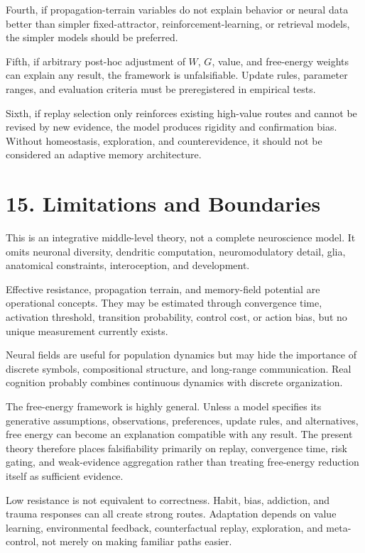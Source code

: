 \documentclass[11pt, a4paper]{article}
\begin{document}
Fourth, if propagation-terrain variables do not explain behavior or neural data better than simpler fixed-attractor, reinforcement-learning, or retrieval models, the simpler models should be preferred.

Fifth, if arbitrary post-hoc adjustment of $W$, $G$, value, and free-energy weights can explain any result, the framework is unfalsifiable. Update rules, parameter ranges, and evaluation criteria must be preregistered in empirical tests.

Sixth, if replay selection only reinforces existing high-value routes and cannot be revised by new evidence, the model produces rigidity and confirmation bias. Without homeostasis, exploration, and counterevidence, it should not be considered an adaptive memory architecture.


\section{15. Limitations and Boundaries}

This is an integrative middle-level theory, not a complete neuroscience model. It omits neuronal diversity, dendritic computation, neuromodulatory detail, glia, anatomical constraints, interoception, and development.

Effective resistance, propagation terrain, and memory-field potential are operational concepts. They may be estimated through convergence time, activation threshold, transition probability, control cost, or action bias, but no unique measurement currently exists.

Neural fields are useful for population dynamics but may hide the importance of discrete symbols, compositional structure, and long-range communication. Real cognition probably combines continuous dynamics with discrete organization.

The free-energy framework is highly general. Unless a model specifies its generative assumptions, observations, preferences, update rules, and alternatives, free energy can become an explanation compatible with any result. The present theory therefore places falsifiability primarily on replay, convergence time, risk gating, and weak-evidence aggregation rather than treating free-energy reduction itself as sufficient evidence.

Low resistance is not equivalent to correctness. Habit, bias, addiction, and trauma responses can all create strong routes. Adaptation depends on value learning, environmental feedback, counterfactual replay, exploration, and meta-control, not merely on making familiar paths easier.
\end{document}
